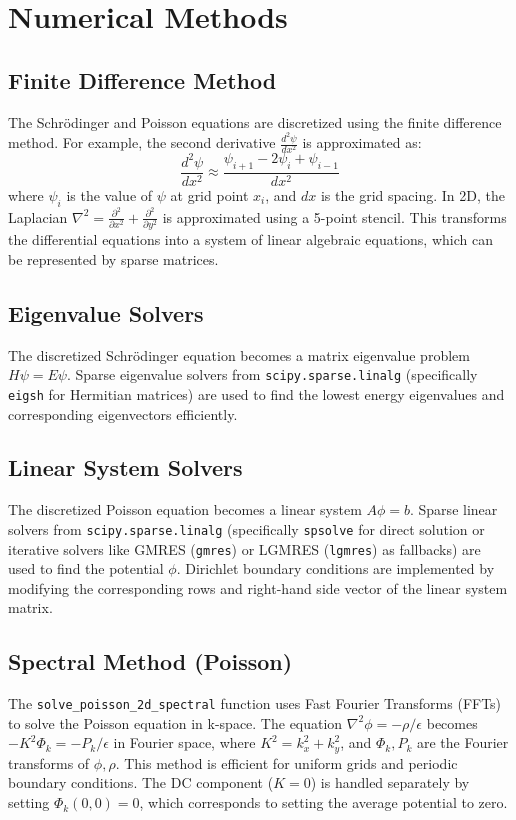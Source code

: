 \documentclass{article}
\begin{document}
\section{Numerical Methods}
\subsection{Finite Difference Method}
The Schrödinger and Poisson equations are discretized using the finite difference method. For example, the second derivative $\frac{d^2\psi}{dx^2}$ is approximated as:
\begin{equation}
	\frac{d^2\psi}{dx^2} \approx \frac{\psi_{i+1} - 2\psi_i + \psi_{i-1}}{dx^2}
\end{equation}
where $\psi_i$ is the value of $\psi$ at grid point $x_i$, and $dx$ is the grid spacing. In 2D, the Laplacian $\nabla^2 = \frac{\partial^2}{\partial x^2} + \frac{\partial^2}{\partial y^2}$ is approximated using a 5-point stencil. This transforms the differential equations into a system of linear algebraic equations, which can be represented by sparse matrices.

\subsection{Eigenvalue Solvers}
The discretized Schrödinger equation becomes a matrix eigenvalue problem $H\psi = E\psi$. Sparse eigenvalue solvers from \texttt{scipy.sparse.linalg} (specifically \texttt{eigsh} for Hermitian matrices) are used to find the lowest energy eigenvalues and corresponding eigenvectors efficiently.

\subsection{Linear System Solvers}
The discretized Poisson equation becomes a linear system $A\phi = b$. Sparse linear solvers from \texttt{scipy.sparse.linalg} (specifically \texttt{spsolve} for direct solution or iterative solvers like GMRES (\texttt{gmres}) or LGMRES (\texttt{lgmres}) as fallbacks) are used to find the potential $\phi$. Dirichlet boundary conditions are implemented by modifying the corresponding rows and right-hand side vector of the linear system matrix.

\subsection{Spectral Method (Poisson)}
The \texttt{solve\_poisson\_2d\_spectral} function uses Fast Fourier Transforms (FFTs) to solve the Poisson equation in k-space. The equation $\nabla^2 \phi = -\rho/\epsilon$ becomes $-K^2 \Phi_k = -P_k/\epsilon$ in Fourier space, where $K^2 = k_x^2 + k_y^2$, and $\Phi_k, P_k$ are the Fourier transforms of $\phi, \rho$. This method is efficient for uniform grids and periodic boundary conditions. The DC component ($K=0$) is handled separately by setting $\Phi_k(0,0)=0$, which corresponds to setting the average potential to zero.
\end{document}

